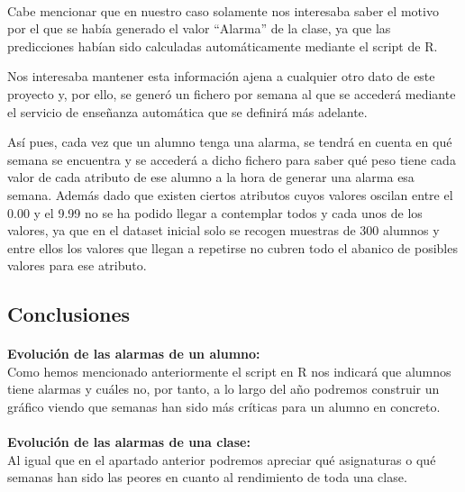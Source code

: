 \paragraph{}
Cabe mencionar que en nuestro caso solamente nos interesaba saber el
motivo por el que se había generado el valor “Alarma” de la clase, ya
que las predicciones habían sido calculadas automáticamente mediante
el script de R.

Nos interesaba mantener esta información ajena a cualquier otro dato
de este proyecto y, por ello, se generó un fichero por semana al que
se accederá mediante el servicio de enseñanza automática que se
definirá más adelante.

Así pues, cada vez que un alumno tenga una alarma, se tendrá en cuenta
en qué semana se encuentra y se accederá a dicho fichero para saber
qué peso tiene cada valor de cada atributo de ese alumno a la hora de
generar una alarma esa semana. Además dado que existen ciertos
atributos cuyos valores oscilan entre el 0.00 y el 9.99 no se ha
podido llegar a contemplar todos y cada unos de los valores, ya que en
el dataset inicial solo se recogen muestras de 300 alumnos y entre
ellos los valores que llegan a repetirse no cubren todo el abanico de
posibles valores para ese atributo.


\subsection{Conclusiones}
\paragraph{}
\textbf{Evolución de las alarmas de un alumno:}\\ 
Como hemos mencionado anteriormente el script en R nos indicará que alumnos tiene alarmas y
cuáles no, por tanto, a lo largo del año podremos construir un gráfico
viendo que semanas han sido más críticas para un alumno en concreto.
\paragraph{}
\textbf{Evolución de las alarmas de una clase:}\\ 
Al igual que en el apartado anterior podremos apreciar qué asignaturas o qué semanas han sido las
peores en cuanto al rendimiento de toda una clase.  
